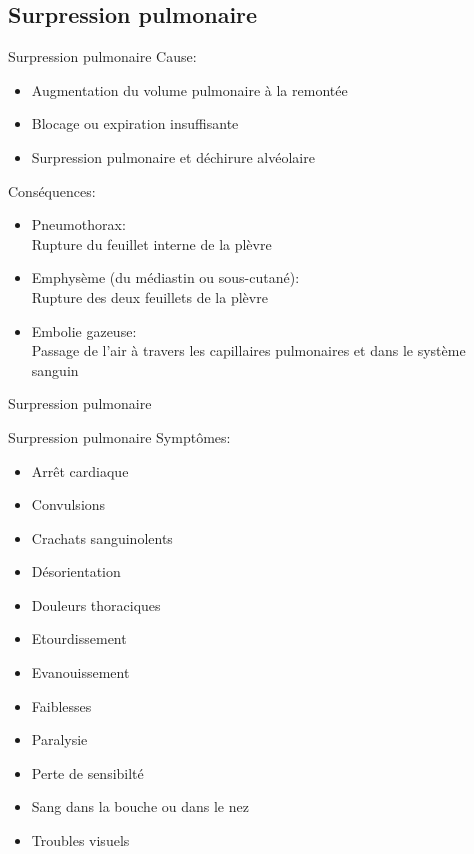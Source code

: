 \subsection{Surpression pulmonaire}

\begin{frame}{Surpression pulmonaire}
	Cause:
	\begin{itemize}
		\item Augmentation du volume pulmonaire à la remontée
		\item Blocage ou expiration insuffisante
		\item Surpression pulmonaire et déchirure alvéolaire
	\end{itemize}
	\vfill
	Conséquences:
	\begin{itemize}
		\item Pneumothorax:\\Rupture du feuillet interne de la plèvre
		\item Emphysème (du médiastin ou sous-cutané):\\Rupture des deux feuillets de la plèvre
		\item Embolie gazeuse:\\Passage de l'air à travers les capillaires pulmonaires et dans le système sanguin
	\end{itemize}
\end{frame}
	
\begin{frame}{Surpression pulmonaire}
\end{frame}

\begin{frame}{Surpression pulmonaire}  
	Symptômes:
	\begin{multicols}{2}
		\begin{itemize}
			\item Arrêt cardiaque
			\item Convulsions
			\item Crachats sanguinolents
			\item Désorientation
			\item Douleurs thoraciques
			\item Etourdissement
			\item Evanouissement
			\item Faiblesses
			\item Paralysie
			\item Perte de sensibilté
			\item Sang dans la bouche ou dans le nez
			\item Troubles visuels
		\end{itemize}
	\end{multicols}
\end{frame}

